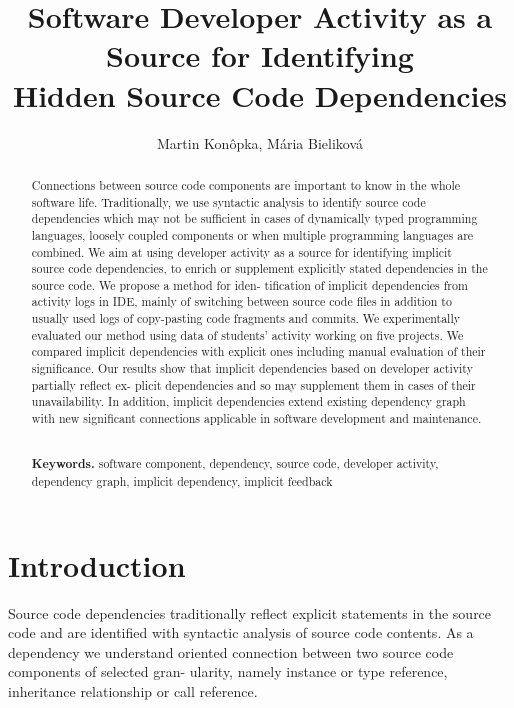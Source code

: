 \documentclass[a4paper]{llncs}
\begin{document}
\title
{Software Developer Activity as a Source for Identifying\\ Hidden Source Code Dependencies}  

\author{Martin Kon\^opka, M\'aria Bielikov\'a}

\maketitle

\begin{abstract}
Connections between source code components are important to know in the whole software life. Traditionally, we use syntactic analysis to identify source code dependencies which may not be sufficient in cases of dynamically typed programming languages, loosely coupled components or when multiple programming languages are combined. We aim at using developer activity as a source for identifying implicit source code dependencies, to enrich or supplement explicitly stated dependencies in the source code. We propose a method for iden- tification of implicit dependencies from activity logs in IDE, mainly of switching between source code files in addition to usually used logs of copy-pasting code fragments and commits. We experimentally evaluated our method using data of students’ activity working on five projects. We compared implicit dependencies with explicit ones including manual evaluation of their significance. Our results show that implicit dependencies based on developer activity partially reflect ex- plicit dependencies and so may supplement them in cases of their unavailability. In addition, implicit dependencies extend existing dependency graph with new significant connections applicable in software development and maintenance.
        
\smallskip
\noindent 
\textbf{\\Keywords.} software component, dependency, source code, developer activity, dependency graph, implicit dependency, implicit feedback

\end{abstract}

\section{Introduction}
Source code dependencies traditionally reflect explicit statements in the source code and are identified with syntactic analysis of source code contents. As a dependency we understand oriented connection between two source code components of selected gran- ularity, namely instance or type reference, inheritance relationship or call reference.
\end{document}
